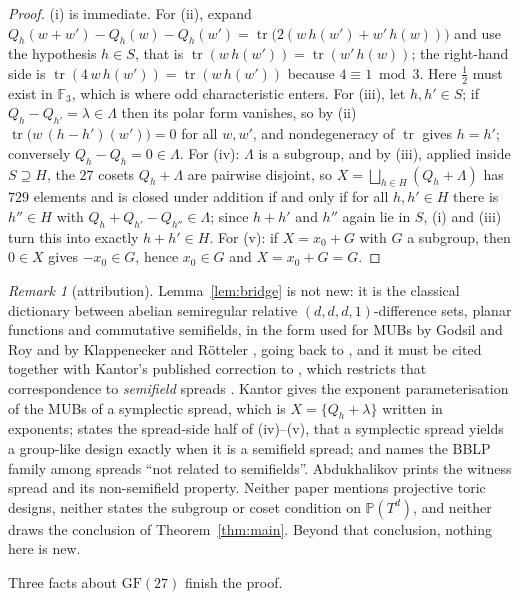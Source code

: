 \documentclass[11pt]{amsart}
\theoremstyle{remark}
\newtheorem{remark}[theorem]{Remark}
\newcommand{\Fq}{\mathbb{F}}
\newcommand{\tr}{\operatorname{tr}}
\newcommand{\GF}{\mathrm{GF}}
\begin{document}
\begin{proof}
(i) is immediate. For (ii), expand
$Q_{h}(w+w')-Q_{h}(w)-Q_{h}(w')=\tr\bigl(2(w\,h(w')+w'\,h(w))\bigr)$ and use the
hypothesis $h\in S$, that is $\tr(w\,h(w'))=\tr(w'\,h(w))$; the right-hand side is
$\tr(4\,w\,h(w'))=\tr(w\,h(w'))$ because $4\equiv1\bmod3$. Here $\tfrac12$ must
exist in $\Fq_{3}$, which is where odd characteristic enters. For (iii), let
$h,h'\in S$; if $Q_{h}-Q_{h'}=\lambda\in\Lambda$ then its polar form vanishes, so
by (ii) $\tr\bigl(w\,(h-h')(w')\bigr)=0$ for all $w,w'$, and nondegeneracy of
$\tr$ gives $h=h'$; conversely $Q_{h}-Q_{h}=0\in\Lambda$. For (iv): $\Lambda$ is
a subgroup,
and by (iii), applied inside $S\supseteq H$, the $27$ cosets $Q_{h}+\Lambda$ are
pairwise disjoint, so $X=\bigsqcup_{h\in H}(Q_{h}+\Lambda)$ has $729$ elements and
is closed under addition if and only if for all $h,h'\in H$ there is $h''\in H$
with $Q_{h}+Q_{h'}-Q_{h''}\in\Lambda$; since $h+h'$ and $h''$ again lie in $S$,
(i) and (iii) turn this into exactly $h+h'\in H$. For (v): if $X=x_{0}+G$ with $G$ a subgroup, then $0\in X$ gives
$-x_{0}\in G$, hence $x_{0}\in G$ and $X=x_{0}+G=G$.
\end{proof}

\begin{remark}[attribution]\label{rem:attr}
Lemma~\ref{lem:bridge} is not new: it is the classical dictionary between
abelian semiregular relative $(d,d,d,1)$-difference sets, planar functions and
commutative semifields, in the form used for MUBs by Godsil and Roy
\cite[\S6]{GR} and by Klappenecker and R\"otteler \cite{KR}, going back to
\cite{CCKS}, and it must be cited together with Kantor's published correction to
\cite[p.~255]{GR}, which restricts that correspondence to \emph{semifield}
spreads \cite{Kan}. Kantor \cite{Kan} gives the exponent parameterisation of the MUBs of
a symplectic spread, which is $X=\{Q_{h}+\lambda\}$ written in exponents; states
the spread-side half of (iv)--(v), that a symplectic spread yields a group-like
design exactly when it is a semifield spread; and names the BBLP family among
spreads ``not related to semifields''. Abdukhalikov \cite{Abd} prints the witness
spread and its non-semifield property. Neither paper mentions projective toric
designs, neither states the subgroup or coset condition on
$\mathbb P(T^{d})$, and neither draws the conclusion of
Theorem~\ref{thm:main}. Beyond that conclusion, nothing here is new.
\end{remark}

Three facts about $\GF(27)$ finish the proof.
\end{document}
